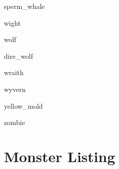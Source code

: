 \documentclass[letterpaper,serif]{module}
\begin{document}
\begin{newmonster}{sperm_whale}\end{newmonster}

\begin{newmonster}{wight}\end{newmonster}

\begin{newmonster}{wolf}\end{newmonster}

\begin{newmonster}{dire_wolf}\end{newmonster}

\begin{newmonster}{wraith}\end{newmonster}

\begin{newmonster}{wyvern}\end{newmonster}

\begin{newmonster}{yellow_mold}\end{newmonster}

\begin{newmonster}{zombie}\end{newmonster}

\onecolumn

\section*{Monster Listing}
\label{wanderingmonsters}
\end{document}
